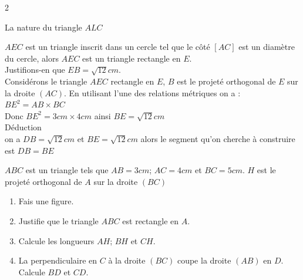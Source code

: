 \begin{multicols*}{2}
  	
  	
  	La nature du triangle $ALC$
  	
  	$AEC$ est un triangle inscrit dans un cercle tel que le côté $[AC]$	est un diamètre du cercle, alors   $AEC$ est un triangle rectangle en $E$.\\
  	Justifions-en que $ EB=\sqrt{12} cm $.\\
  	Considérons le triangle $AEC$  rectangle en $E$, $B$ est le projeté orthogonal de $E$ sur la droite $(AC)$. En utilisant l'une des relations métriques on a : $BE^2 = AB \times BC$\\ Donc  $BE^2 = 3cm \times 4cm$ ainsi  $BE= \sqrt{12}cm$\\
  	Déduction \\ on a $ DB=\sqrt{12}cm $ et $BE= \sqrt{12}cm$ alors le segment qu'on cherche à construire est $ DB=BE $
  	\begin{center}
  	\end{center}
  	\begin{center}
  	\end{center}
  	
  	$ABC$ est un triangle tels que $AB=3cm$; $AC=4cm$ et $BC=5cm$. $H$ est le projeté orthogonal de $A$ sur la droite $(BC)$ 
  	\begin{enumerate}
  		\item Fais une figure.
  		\item  Justifie que le triangle $ABC$ est rectangle en $A$.
  		\item  Calcule les longueurs $AH$; $BH$ et $CH$.
  		\item  La perpendiculaire en $C$ à la droite $(BC)$ coupe la droite $(AB)$ en $D$. Calcule $BD$ et $CD$.
  	\end{enumerate}
  	\begin{center}
  	\end{center}
  	

\end{multicols*}
